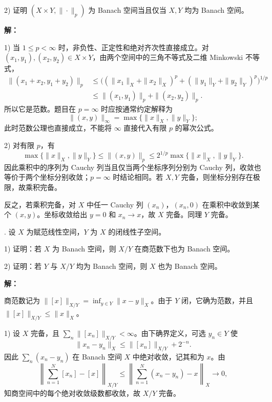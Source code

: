 \documentclass{article}
\begin{document}
2) 证明 $(X\times Y,\|\cdot\|_p)$ 为 Banach 空间当且仅当 $X,Y$ 均为 Banach 空间。


\par{}\noindent\textbf{解：}\par\nopagebreak[4]



1) 当 $1\le p<\infty$ 时，非负性、正定性和绝对齐次性直接成立。对 $(x_1,y_1),(x_2,y_2)\in X\times Y$，由两个空间中的三角不等式及二维 Minkowski 不等式，
\[
\begin{aligned}
\|(x_1+x_2,y_1+y_2)\|_p
&\le\bigl((\|x_1\|_X+\|x_2\|_X)^p+(\|y_1\|_Y+\|y_2\|_Y)^p\bigr)^{1/p}\\
&\le\|(x_1,y_1)\|_p+\|(x_2,y_2)\|_p.
\end{aligned}
\]
所以它是范数。题目在 $p=\infty$ 时应按通常约定解释为
\[
\|(x,y)\|_\infty=\max\{\|x\|_X,\|y\|_Y\};
\]
此时范数公理也直接成立，不能将 $\infty$ 直接代入有限 $p$ 的幂次公式。

2) 对有限 $p$，有
\[
\max\{\|x\|_X,\|y\|_Y\}\le\|(x,y)\|_p
\le2^{1/p}\max\{\|x\|_X,\|y\|_Y\}.
\]
因此乘积中的序列为 Cauchy 列当且仅当两个坐标序列分别为 Cauchy 列，收敛也等价于两个坐标分别收敛；$p=\infty$ 时结论相同。若 $X,Y$ 完备，则坐标分别存在极限，故乘积完备。

反之，若乘积完备，对 $X$ 中任一 Cauchy 列 $(x_n)$，$(x_n,0)$ 在乘积中收敛到某个 $(x,y)$。坐标收敛给出 $y=0$ 和 $x_n\to x$，故 $X$ 完备。同理 $Y$ 完备。


\par\medskip{}. 设 $X$ 为赋范线性空间，$Y$ 为 $X$ 的闭线性子空间。

1) 证明：若 $X$ 为 Banach 空间，则 $X/Y$ 在商范数下也为 Banach 空间。

2) 证明：若 $Y$ 与 $X/Y$ 均为 Banach 空间，则 $X$ 也为 Banach 空间。


\par{}\noindent\textbf{解：}\par\nopagebreak[4]



商范数记为 $\|[x]\|_{X/Y}=\inf_{y\in Y}\|x-y\|_X$。由于 $Y$ 闭，它确为范数，并且 $\|[x]\|_{X/Y}\le\|x\|_X$。

1) 设 $X$ 完备，且 $\sum_n\|[x_n]\|_{X/Y}<\infty$。由下确界定义，可选 $y_n\in Y$ 使
\[
\|x_n-y_n\|_X\le\|[x_n]\|_{X/Y}+2^{-n}.
\]
因此 $\sum_n(x_n-y_n)$ 在 Banach 空间 $X$ 中绝对收敛，记其和为 $x$。由
\[
\left\|\sum_{n=1}^N[x_n]-[x]\right\|_{X/Y}
\le\left\|\sum_{n=1}^N(x_n-y_n)-x\right\|_X\longrightarrow0,
\]
知商空间中的每个绝对收敛级数都收敛，故 $X/Y$ 完备。
\end{document}
